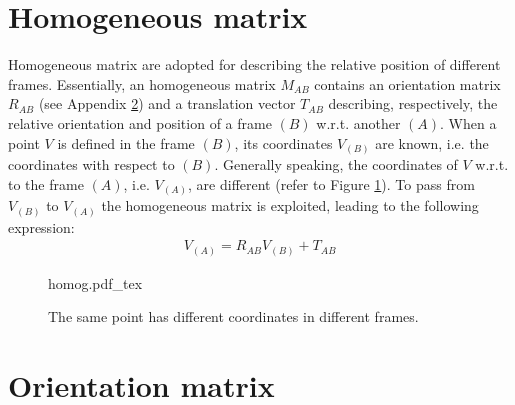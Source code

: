 \documentclass{article}
\begin{document}
\begin{appendices}
\section{Homogeneous matrix}
\label{Sec:homog}

Homogeneous matrix are adopted for describing the relative position of different frames. Essentially, an homogeneous matrix $M_{AB}$ contains an orientation matrix $R_{AB}$ (see Appendix \ref{Sec:rot_XYZ}) and a translation vector $T_{AB}$ describing, respectively, the relative orientation and position of a frame $(B)$ w.r.t. another $(A)$. When a point $V$ is defined in the frame $(B)$, its coordinates $V_{(B)}$ are known, i.e. the coordinates with respect to $(B)$. Generally speaking, the coordinates of $V$ w.r.t. to the frame $(A)$, i.e. $V_{(A)}$, are different (refer to Figure \ref{fig:frames}).
To pass from $V_{(B)}$ to $V_{(A)}$ the homogeneous matrix is exploited, leading to the following expression:
\begin{eqnarray}
V_{(A)} = R_{AB} V_{(B)} + T_{AB}
\end{eqnarray}

\begin{figure}
	\centering
\def\svgwidth{0.8 \columnwidth}
{homog.pdf_tex} 
	\caption{The same point has different coordinates in different frames. }
	\label{fig:frames}
\end{figure}
 
\section{Orientation matrix} 
\label{Sec:rot_XYZ}


\end{appendices}
\end{document}
